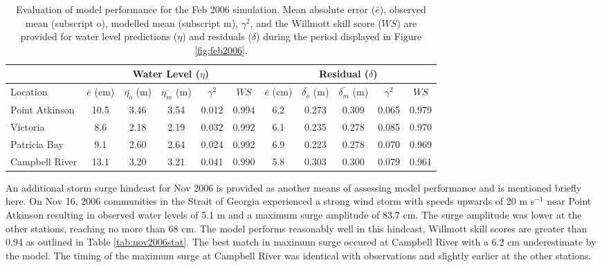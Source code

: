 \documentclass[pdftex,10pt]{article}
\begin{document}
\begin{table}[h]
\centering 
\begin{tabular}{|l |c c c c c | c c c c c|} 
\hline 
& \multicolumn{5}{|c|}{Water Level ($\eta$)}        & \multicolumn{5}{|c|}{Residual ($\delta$)} \\ 
\hline 
Location       & $\bar{e}$ (cm) & $\bar{\eta_{o}}$ (m) & $\bar{\eta_{m}}$ (m) & $\gamma^2$ & $WS$   & $\bar{e}$ (cm) & $\bar{\delta_{o}}$ (m) & $\bar{\delta_{m}}$ (m) & $\gamma^2$ & $WS$ \\
\hline 
Point Atkinson & 10.5           & 3.46                 & 3.54                 &   0.012    & 0.994  & 6.2            &  0.273                 & 0.309                  & 0.065     & 0.979     \\
Victoria       &  8.6           & 2.18                 & 2.19                 &   0.032    & 0.992  & 6.1            &  0.235                 & 0.278                  & 0.085     & 0.970     \\
Patricia Bay   &  9.1           & 2.60                 & 2.64                 &   0.024    & 0.992  & 6.9            &  0.223                 & 0.278                  & 0.070     & 0.969     \\
Campbell River & 13.1           & 3.20                 & 3.21                 &   0.041    & 0.990  & 5.8            &  0.303                 & 0.300                  & 0.079     & 0.961     \\
\hline 
\end{tabular}
\caption{Evaluation of model performance for the Feb 2006 simulation. Mean absolute error ($\bar{e}$), observed mean (subscript o), modelled mean (subscript m), $\gamma^2$, and the Willmott skill score ($WS$) are provided for water level predictions ($\eta$) and residuals ($\delta$) during the period displayed in Figure \ref{fig:feb2006}.}
\label{tab:feb2006stat} 
\end{table} 

An additional storm surge hindcast for Nov 2006 is provided as another means of assessing model performance and is mentioned briefly here. On Nov 16, 2006 communities in the Strait of Georgia experienced a strong wind storm with speeds upwards of 20 m s$^{-1}$ near Point Atkinson resulting in observed water levels of 5.1 m and a maximum surge amplitude of 83.7 cm. The surge amplitude was lower at the other stations, reaching no more than 68 cm. The model performs reasonably well in this hindcast, Willmott skill scores are greater than 0.94 as outlined in Table \ref{tab:nov2006stat}.  The best match in maximum surge occured at Campbell River with a 6.2 cm underestimate by the model. The timing of the maximum surge at Campbell River was identical with observations and slightly earlier at the other stations. 
\end{document}
